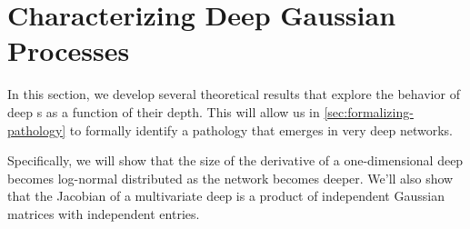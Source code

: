 %


%





\section{Characterizing Deep Gaussian Processes}
\label{sec:characterizing-deep-gps}

In this section, we develop several theoretical results that explore the behavior of deep \gp{}s as a function of their depth.
This will allow us in \cref{sec:formalizing-pathology} to formally identify a pathology that emerges in very deep networks.

Specifically, we will show that the size of the derivative of a one-dimensional deep \gp{} becomes log-normal distributed as the network becomes deeper.
We'll also show that the Jacobian of a multivariate deep \gp{} is a product of independent Gaussian matrices with independent entries.



